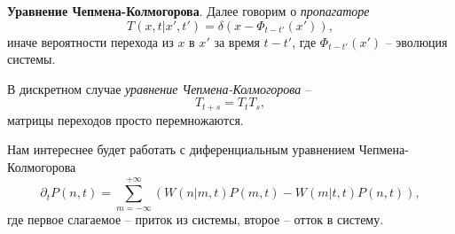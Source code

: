 \textbf{Уравнение Чепмена-Колмогорова}. Далее говорим о \textit{пропагаторе}
\begin{equation*}
	T(x, t| x', t') = \delta(x - \Phi_{t-t'}(x')),
\end{equation*}
иначе вероятности перехода из $x$ в $x'$ за время $t-t'$, где $\Phi_{t-t'}(x')$ -- эволюция системы. 

В дискретном случае \textit{уравнение Чепмена-Колмогорова} --
\begin{equation*}
	T_{t+s} = T_t T_s,
\end{equation*}
матрицы переходов просто перемножаются. 


Нам интереснее будет работать с диференциальным уравнением Чепмена-Колмогорова
\begin{equation}
	\partial_t P(n, t) = \sum_{m=-\infty}^{+\infty} \left(
		W(n|m, t) P(m,t) - W(m|t,t) P(n, t)
	\right),
\end{equation}
где первое слагаемое -- приток из системы, второе -- отток в систему.